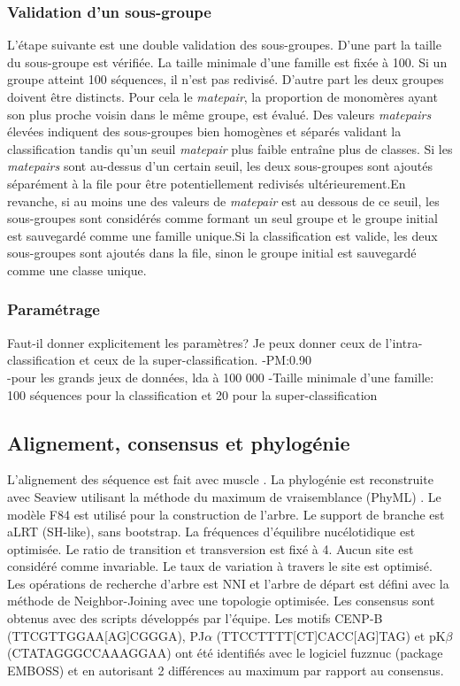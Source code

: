 \documentclass[12pt,a4paper]{article}
\begin{document}
	\subsubsection{Validation d'un sous-groupe}
L'étape suivante est une double validation des sous-groupes. D'une part la taille du sous-groupe est vérifiée. La taille minimale d'une famille est fixée à 100. Si un groupe atteint 100 séquences, il n'est pas redivisé. D'autre part les deux groupes doivent être distincts. Pour cela le \textit{matepair}, la proportion de monomères ayant son plus proche voisin dans le même groupe, est évalué. Des valeurs \textit{matepairs} élevées indiquent des sous-groupes bien homogènes et séparés validant la classification tandis qu’un seuil \textit{matepair} plus faible entraîne plus de classes. Si les \textit{matepairs} sont au-dessus d’un certain seuil, les deux sous-groupes sont ajoutés séparément à la file pour être potentiellement redivisés ultérieurement.En revanche, si au moins une des valeurs de \textit{matepair} est au dessous de ce seuil, les sous-groupes sont considérés comme formant un seul groupe et le groupe initial est sauvegardé comme une famille unique.Si la classification est valide, les deux sous-groupes sont ajoutés dans la file, sinon le groupe initial est sauvegardé comme une classe unique. 
	\subsubsection{Paramétrage}
Faut-il donner explicitement les paramètres? Je peux donner ceux de l'intra-classification et ceux de la super-classification. 
	-PM:0.90\\
	-pour les grands jeux de données, lda à 100 000
	-Taille minimale d'une famille: 100 séquences pour la classification et 20 pour la super-classification

\subsection{Alignement, consensus et phylogénie}
L'alignement des séquence est fait avec muscle \cite{muscle}. La phylogénie est reconstruite avec Seaview 
\cite{seaview} utilisant la méthode du maximum de vraisemblance (PhyML) \cite{phyml}. Le modèle F84 est utilisé pour la construction de l'arbre. Le support de branche est aLRT (SH-like), sans bootstrap. La fréquences d'équilibre nucélotidique est optimisée. Le ratio de transition et transversion est fixé à 4. Aucun site est considéré comme invariable. Le taux de variation à travers le site est optimisé. Les opérations de recherche d'arbre est NNI et l'arbre de départ est défini avec la méthode de Neighbor-Joining \cite{NJ} avec une topologie optimisée.
Les consensus sont obtenus avec des scripts développés par l'équipe. Les motifs CENP-B (TTCGTTGGAA[AG]CGGGA), PJ$\alpha$ (TTCCTTTT[CT]CACC[AG]TAG) et pK$\beta$ (CTATAGGGCCAAAGGAA) ont été identifiés avec le logiciel fuzznuc (package EMBOSS) \cite{emboss} et en autorisant 2 différences au maximum par rapport au consensus. 
\end{document}
